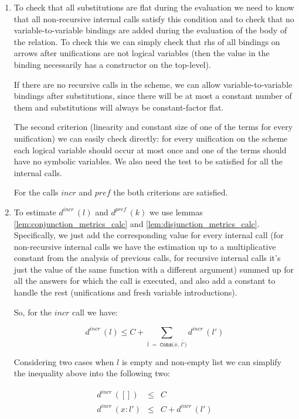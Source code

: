\begin{enumerate}
\item To check that all substitutions are flat during the evaluation we need to know that all non-recursive internal calls satisfy this condition and to check that no variable-to-variable bindings are added during the evaluation of the body of the relation. To check this we can simply check that rhs of all bindings on arrows after unifications are not logical variables (then the value in the binding
necessarily has a constructor on the top-level).

If there are no recursive calls in the scheme, we can allow variable-to-variable bindings after substitutions, since there will be at most a constant number of them and substitutions will always be constant-factor flat.

The second criterion (linearity and constant size of one of the terms for every unification) we can easily check directly: for every unification on the scheme each logical variable should occur at most once and one of the terms should have no symbolic variables. We also need the test to be satisfied for all the internal calls.

For the calls $incr$ and $pref$ the both criterions are satisfied.

\item To estimate $d^{incr}\,(l)$ and $d^{pref}\,(k)$ we use lemmas \ref{lem:conjunction_metrics_calc} and \ref{lem:disjunction_metrics_calc}. Specifically, we just add the corresponding value for every internal call
  (for non-recursive internal calls we have the estimation up to a multiplicative constant from the analysis of previous calls, for recursive internal calls it's just the value of the same function with a
  different argument) summed up for all the answers for which the call is executed, and also add a constant to handle the rest (unifications and fresh variable introductions).
  
So, for the $incr$ call we have:

\[ d^{incr}\,(l) \le C + \sum_{\overline{l} \;=\; \texttt{Cons($\overline{x}$, $\overline{l'}$)}} d^{incr}\,(l') \]

Considering two cases when $l$ is empty and non-empty list we can simplify the inequality above into the following two:

\[
\begin{array}{lcl}
d^{incr}\,([]) &\le& C \\
d^{incr}\,(x : l') &\le& C + d^{incr}\,(l')
\end{array} \]


\end{enumerate}
